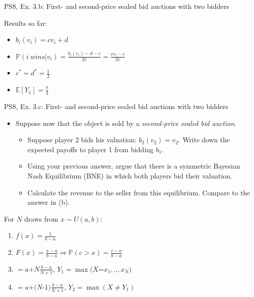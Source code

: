 \begin{frame}{PS8, Ex. 3.b: First- and second-price sealed bid auctions with two bidders}
\begin{multicols}{2}
      \vspace{-6pt}
      Results so far:
      \vspace{-6pt}
      \begin{itemize}
        \item[($*$)]  $b_i(v_i) = cv_i+d$
        \item[($**$)] $\mathbb{P}(i\ wins|v_i)=\frac{b_i(v_i)-d-c}{2c}=\frac{cv_i-c}{2c}$
        \item[(3.a)]    $c^*=d^*=\frac{1}{2}$
        \item[\nth{1}:] $\mathbb{E}[Y_1]=\frac{7}{3}$
      \end{itemize}
      \vfill\null
    \end{multicols}
\end{frame}



\begin{frame}{PS8, Ex. 3.c: First- and second-price sealed bid auctions with two bidders}
    \begin{multicols}{2}
      \begin{itemize}
        \item[(c)] Suppose now that the object is sold by a \textit{second-price sealed bid auction}.
        \begin{itemize}\normalsize
          \item[i.]   Suppose player 2 bids his valuation: $b_2(v_2) = v_2$. Write down the expected payoffs to player 1 from bidding $b_1$.
          \item[ii.]  Using your previous answer, argue that there is a symmetric Bayesian Nash Equilibrium (BNE) in which both players bid their valuation.
          \item[iii.] Calculate the revenue to the seller from this equilibrium. Compare to the answer in (b).
        \end{itemize}
      \end{itemize}
      For $N$ draws from $x\sim U(a, b):$
      \vspace{-6pt}
      \begin{enumerate}
        \item[PDF:] $f(x)=\frac{1}{b-a}$
        \item[CDF:] $F(x)=\frac{x-a}{b-a}\Rightarrow\mathbb{P}(c>x)=\frac{c-a}{b-a}$
        \item[$\mathbb{E}(Y_1)$] $=a$+$N\frac{b-a}{N+1}$, $Y_1=\max(X$=$x_1,..,x_N)$
        \item[$\mathbb{E}(Y_2)$] $=a$+$(N$-1$)\frac{b-a}{N+1}$, $Y_2=\max(X\neq Y_1)$
      \end{enumerate}
      \vfill\null\columnbreak
      \vfill\null
    \end{multicols}
\end{frame}


